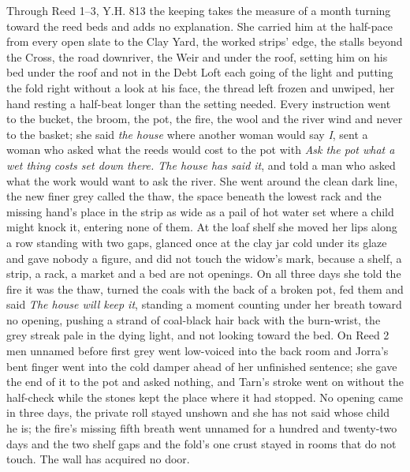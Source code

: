 \documentclass{design/chronicle}
\begin{document}
{Through Reed 1–3, Y.H. 813 the keeping takes the measure of a month turning toward the reed beds and adds no explanation. She carried him at the half-pace from every open slate to the Clay Yard, the worked strips’ edge, the stalls beyond the Cross, the road downriver, the Weir and under the roof, setting him on his bed under the roof and not in the Debt Loft each going of the light and putting the fold right without a look at his face, the thread left frozen and unwiped, her hand resting a half-beat longer than the setting needed. Every instruction went to the bucket, the broom, the pot, the fire, the wool and the river wind and never to the basket; she said \emph{the house} where another woman would say \emph{I}, sent a woman who asked what the reeds would cost to the pot with \emph{Ask the pot what a wet thing costs set down there. The house has said it}, and told a man who asked what the work would want to ask the river. She went around the clean dark line, the new finer grey called the thaw, the space beneath the lowest rack and the missing hand’s place in the strip as wide as a pail of hot water set where a child might knock it, entering none of them. At the loaf shelf she moved her lips along a row standing with two gaps, glanced once at the clay jar cold under its glaze and gave nobody a figure, and did not touch the widow’s mark, because a shelf, a strip, a rack, a market and a bed are not openings. On all three days she told the fire it was the thaw, turned the coals with the back of a broken pot, fed them and said \emph{The house will keep it}, standing a moment counting under her breath toward no opening, pushing a strand of coal-black hair back with the burn-wrist, the grey streak pale in the dying light, and not looking toward the bed. On Reed 2 men unnamed before first grey went low-voiced into the back room and Jorra’s bent finger went into the cold damper ahead of her unfinished sentence; she gave the end of it to the pot and asked nothing, and Tarn’s stroke went on without the half-check while the stones kept the place where it had stopped. No opening came in three days, the private roll stayed unshown and she has not said whose child he is; the fire’s missing fifth breath went unnamed for a hundred and twenty-two days and the two shelf gaps and the fold’s one crust stayed in rooms that do not touch. The wall has acquired no door.

}
\end{document}
